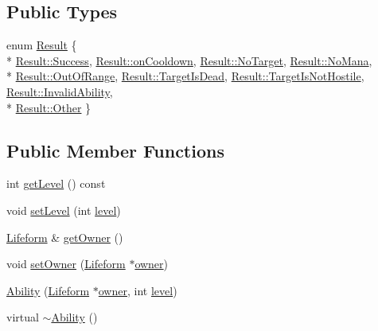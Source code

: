 \subsection*{Public Types}
\begin{DoxyCompactItemize}
\item 
enum \hyperlink{classZeta_1_1Ability_acbc80e4d82c9683d190ed8ca1c80f597}{Result} \{ \\*
\hyperlink{classZeta_1_1Ability_acbc80e4d82c9683d190ed8ca1c80f597a505a83f220c02df2f85c3810cd9ceb38}{Result\+::\+Success}, 
\hyperlink{classZeta_1_1Ability_acbc80e4d82c9683d190ed8ca1c80f597ae3c0ba3c83c17a047a9a5c4f53be2217}{Result\+::on\+Cooldown}, 
\hyperlink{classZeta_1_1Ability_acbc80e4d82c9683d190ed8ca1c80f597aff4d8f7b051f09ecae01888dda54c15c}{Result\+::\+No\+Target}, 
\hyperlink{classZeta_1_1Ability_acbc80e4d82c9683d190ed8ca1c80f597a78833d84bf23f43a08b9ad42eb11dd89}{Result\+::\+No\+Mana}, 
\\*
\hyperlink{classZeta_1_1Ability_acbc80e4d82c9683d190ed8ca1c80f597a365b2699d38b61ef4b4c8a1066c8468f}{Result\+::\+Out\+Of\+Range}, 
\hyperlink{classZeta_1_1Ability_acbc80e4d82c9683d190ed8ca1c80f597ac926f8700f3a5b1ae6f9ef9675ca93fd}{Result\+::\+Target\+Is\+Dead}, 
\hyperlink{classZeta_1_1Ability_acbc80e4d82c9683d190ed8ca1c80f597aff0026030492922584aab202394db49a}{Result\+::\+Target\+Is\+Not\+Hostile}, 
\hyperlink{classZeta_1_1Ability_acbc80e4d82c9683d190ed8ca1c80f597a48c2128daef352af23cb92c859d06d5f}{Result\+::\+Invalid\+Ability}, 
\\*
\hyperlink{classZeta_1_1Ability_acbc80e4d82c9683d190ed8ca1c80f597a6311ae17c1ee52b36e68aaf4ad066387}{Result\+::\+Other}
 \}
\end{DoxyCompactItemize}
\subsection*{Public Member Functions}
\begin{DoxyCompactItemize}
\item 
int \hyperlink{classZeta_1_1Ability_a472b49c779602e2839a0afa4a504ebf0}{get\+Level} () const 
\item 
void \hyperlink{classZeta_1_1Ability_af8e3a64ad3b461ee91cc10b896a16684}{set\+Level} (int \hyperlink{classZeta_1_1Ability_a41d29a6fb79dd19a7eed5f6a4be5de9a}{level})
\item 
\hyperlink{classZeta_1_1Lifeform}{Lifeform} \& \hyperlink{classZeta_1_1Ability_a3bec1acb0d85225a0b067bc14b497100}{get\+Owner} ()
\item 
void \hyperlink{classZeta_1_1Ability_a14e4cb9c0e8b9d35bd46659291f73f76}{set\+Owner} (\hyperlink{classZeta_1_1Lifeform}{Lifeform} $\ast$\hyperlink{classZeta_1_1Ability_ad37bed67f04178297d6fe4c9a2ed619a}{owner})
\item 
\hyperlink{classZeta_1_1Ability_aeb18eb5f68dec2d1a7fc15cf35ba35e6}{Ability} (\hyperlink{classZeta_1_1Lifeform}{Lifeform} $\ast$\hyperlink{classZeta_1_1Ability_ad37bed67f04178297d6fe4c9a2ed619a}{owner}, int \hyperlink{classZeta_1_1Ability_a41d29a6fb79dd19a7eed5f6a4be5de9a}{level})
\item 
virtual \hyperlink{classZeta_1_1Ability_a234169c0dbb3ffe0086ca628901b705d}{$\sim$\+Ability} ()
\end{DoxyCompactItemize}
